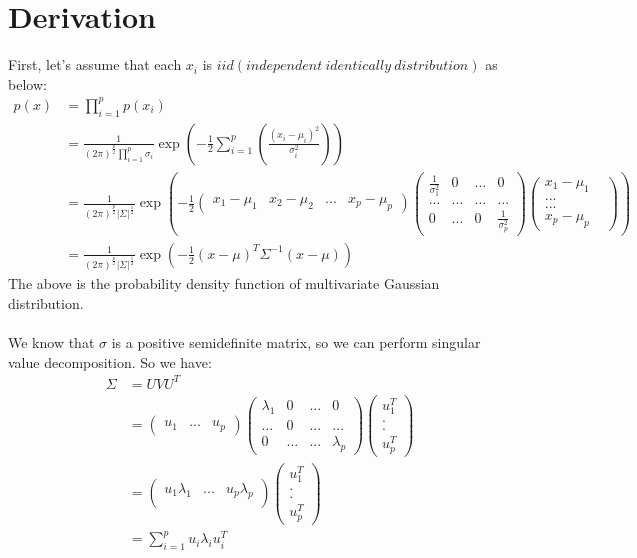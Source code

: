 \documentclass{report}
\begin{document}
\section{Derivation}
First, let's assume that each $x_i$ is $iid (independent\ identically\ distribution)$ as below:
$$
\begin{aligned}
p(x)
&=\prod_{i=1}^p p(x_i)\\
&=\frac{1}{(2\pi)^{\frac{p}{2}}\prod_{i=1}^p \sigma_i} \exp(-\frac{1}{2}\sum_{i=1}^p (\frac{(x_i-\mu_i)^2}{\sigma_i^2}))\\
&=\frac{1}{(2\pi)^{\frac{p}{2}}|\Sigma|^{\frac{1}{2}}} \exp(-\frac{1}{2}
\left (
\begin{matrix}
x_1-\mu_1 & x_2-\mu_2 & ... & x_p - \mu_p
\end{matrix}
\right )
\left (
\begin{matrix}
\frac{1}{\sigma_1^2} & 0 & ... & 0 \\
... & ... & ... & ... \\
0 & ... & 0 & \frac{1}{\sigma_p^2}
\end{matrix}
\right )
\left (
\begin{matrix}
x_1-\mu_1\\
...&\\
...&\\
x_p-\mu_p
\end{matrix}
\right ))\\
&=\frac{1}{(2\pi)^{\frac{p}{2}}|\Sigma|^{\frac{1}{2}}} \exp(-\frac{1}{2}(x-\mu)^T \Sigma^{-1}(x-\mu))
\end{aligned}
\label{Gau.pdf}
$$
The above is the probability density function of multivariate Gaussian distribution.\\\\
We know that $\sigma$ is a positive semidefinite matrix, so we can perform singular value decomposition. So we have:
$$
\begin{aligned}
\Sigma
&=UVU^T\\
&=
\left ( \begin{matrix}
u_1 & ... & u_p
\end{matrix} \right )
\left ( \begin{matrix}
\lambda_1 & 0 & ... & 0\\
... & 0 & ... & ...\\
0 & ... & ... & \lambda_p
\end{matrix} \right )
\left ( \begin{matrix}
u_1^T \\
.\\
.\\
u_p^T
\end{matrix} \right )\\
&=
\left ( \begin{matrix}
u_1\lambda_1 & ... & u_p \lambda_p\\
\end{matrix} \right )
\left ( \begin{matrix}
u_1^T\\
.\\
.\\
u_p^T
\end{matrix} \right )\\
&=\sum_{i=1}^p u_i\lambda_i u_i^T
\end{aligned}
$$
\end{document}
